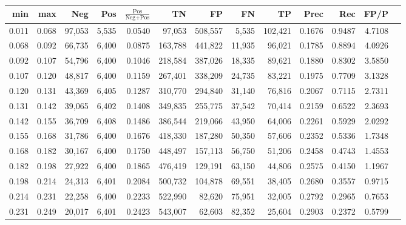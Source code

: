 \begin{tabular}{rrrrrrrrrrrrr}
\toprule
  min &   max &    Neg &   Pos & $\frac{\text{Pos}}{\text{Neg}+\text{Pos}}$ &      TN &      FP &      FN &      TP &   Prec &    Rec &   FP/P \\
\midrule
0.011 & 0.068 & 97,053 & 5,535 &                                     0.0540 &  97,053 & 508,557 &   5,535 & 102,421 & 0.1676 & 0.9487 & 4.7108 \\
0.068 & 0.092 & 66,735 & 6,400 &                                     0.0875 & 163,788 & 441,822 &  11,935 &  96,021 & 0.1785 & 0.8894 & 4.0926 \\
0.092 & 0.107 & 54,796 & 6,400 &                                     0.1046 & 218,584 & 387,026 &  18,335 &  89,621 & 0.1880 & 0.8302 & 3.5850 \\
0.107 & 0.120 & 48,817 & 6,400 &                                     0.1159 & 267,401 & 338,209 &  24,735 &  83,221 & 0.1975 & 0.7709 & 3.1328 \\
0.120 & 0.131 & 43,369 & 6,405 &                                     0.1287 & 310,770 & 294,840 &  31,140 &  76,816 & 0.2067 & 0.7115 & 2.7311 \\
0.131 & 0.142 & 39,065 & 6,402 &                                     0.1408 & 349,835 & 255,775 &  37,542 &  70,414 & 0.2159 & 0.6522 & 2.3693 \\
0.142 & 0.155 & 36,709 & 6,408 &                                     0.1486 & 386,544 & 219,066 &  43,950 &  64,006 & 0.2261 & 0.5929 & 2.0292 \\
0.155 & 0.168 & 31,786 & 6,400 &                                     0.1676 & 418,330 & 187,280 &  50,350 &  57,606 & 0.2352 & 0.5336 & 1.7348 \\
0.168 & 0.182 & 30,167 & 6,400 &                                     0.1750 & 448,497 & 157,113 &  56,750 &  51,206 & 0.2458 & 0.4743 & 1.4553 \\
0.182 & 0.198 & 27,922 & 6,400 &                                     0.1865 & 476,419 & 129,191 &  63,150 &  44,806 & 0.2575 & 0.4150 & 1.1967 \\
0.198 & 0.214 & 24,313 & 6,401 &                                     0.2084 & 500,732 & 104,878 &  69,551 &  38,405 & 0.2680 & 0.3557 & 0.9715 \\
0.214 & 0.231 & 22,258 & 6,400 &                                     0.2233 & 522,990 &  82,620 &  75,951 &  32,005 & 0.2792 & 0.2965 & 0.7653 \\
0.231 & 0.249 & 20,017 & 6,401 &                                     0.2423 & 543,007 &  62,603 &  82,352 &  25,604 & 0.2903 & 0.2372 & 0.5799 \\

\end{tabular}

